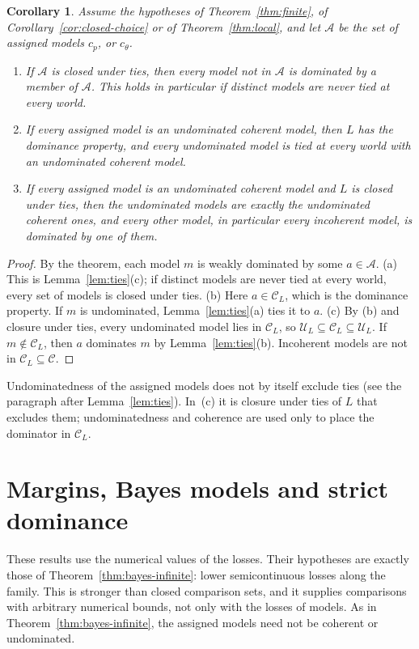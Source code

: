 \documentclass[11pt]{article}
\newtheorem{corollary}[theorem]{Corollary}
\theoremstyle{definition}
\theoremstyle{remark}
\newcommand{\C}{\mathcal C}
\newcommand{\U}{\mathcal U}
\begin{document}
\begin{corollary}\label{cor:coherent-assigned}
Assume the hypotheses of Theorem~\ref{thm:finite}, of Corollary~\ref{cor:closed-choice} or of Theorem~\ref{thm:local}, and let $\mathcal A$ be the set of assigned models $c_p$, or $c_\theta$.
\begin{enumerate}[label=(\alph*)]
\item If $\mathcal A$ is closed under ties, then every model not in $\mathcal A$ is dominated by a member of $\mathcal A$. This holds in particular if distinct models are never tied at every world.
\item If every assigned model is an undominated coherent model, then $L$ has the dominance property, and every undominated model is tied at every world with an undominated coherent model.
\item If every assigned model is an undominated coherent model and $L$ is closed under ties, then the undominated models are exactly the undominated coherent ones, and every other model, in particular every incoherent model, is dominated by one of them.
\end{enumerate}
\end{corollary}
\begin{proof}
By the theorem, each model $m$ is weakly dominated by some $a\in\mathcal A$. (a) This is Lemma~\ref{lem:ties}(c); if distinct models are never tied at every world, every set of models is closed under ties. (b) Here $a\in\C_L$, which is the dominance property. If $m$ is undominated, Lemma~\ref{lem:ties}(a) ties it to $a$. (c) By (b) and closure under ties, every undominated model lies in $\C_L$, so $\U_L\subseteq\C_L\subseteq\U_L$. If $m\notin\C_L$, then $a$ dominates $m$ by Lemma~\ref{lem:ties}(b). Incoherent models are not in $\C_L\subseteq\C$.
\end{proof}

Undominatedness of the assigned models does not by itself exclude ties (see the paragraph after Lemma~\ref{lem:ties}). In~(c) it is closure under ties of $L$ that excludes them; undominatedness and coherence are used only to place the dominator in $\C_L$.

\section{Margins, Bayes models and strict dominance}\label{sec:margins}
These results use the numerical values of the losses. Their hypotheses are exactly those of Theorem~\ref{thm:bayes-infinite}: lower semicontinuous losses along the family. This is stronger than closed comparison sets, and it supplies comparisons with arbitrary numerical bounds, not only with the losses of models. As in Theorem~\ref{thm:bayes-infinite}, the assigned models need not be coherent or undominated.
\end{document}
